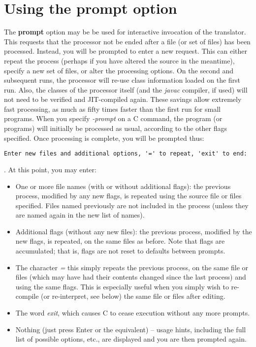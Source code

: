 \chapter{Using the prompt option}
The \textbf{prompt} option may be be used for interactive invocation of
the translator. This requests that the processor not be ended after a
file (or set of files) has been processed.  Instead, you will be
prompted to enter a new request.  This can either repeat the process
(perhaps if you have altered the source in the meantime), specify a new
set of files, or alter the processing options.
\newline
On the second and subsequent runs, the processor will re-use class
information loaded on the first run.  Also, the classes of the processor
itself (and the \emph{javac} compiler, if used) will not need to be
verified and JIT-compiled again.  These savings allow extremely fast
processing, as much as fifty times faster than the first run for small
programs.
\newline
When you specify \emph{-prompt} on a \nr{}C command, the \nr{}
program (or programs) will initially be processed as usual, according to
the other flags specified.  Once processing is complete, you will be
prompted thus:
\begin{verbatim}
Enter new files and additional options, '=' to repeat, 'exit' to end:
\end{verbatim}.
\newline
At this point, you may enter:
\begin{itemize}
\item One or more file names (with or without additional flags): the previous
process, modified by any new flags, is repeated using the source file
or files specified.  Files named previously are not included in the
process (unless they are named again in the new list of names).
\item Additional flags (without any new files): the previous process, modified
by the new flags, is repeated, on the same files as before.
Note that flags are accumulated; that is, flags are not reset to
defaults between prompts.
\item The character \emph{=} this simply repeats the previous process,
on the same file or files (which may have had their contents changed
since the last process) and using the same flags.  This is especially
useful when you simply wish to re-compile (or re-interpret, see below)
the same file or files after editing.
\item
{}
The word \emph{exit}, which causes \nr{}C to cease execution
without any more prompts.
\item
Nothing (just press Enter or the equivalent) -- usage hints, including
the full list of possible options, etc., are displayed and you are then
prompted again.
\end{itemize}

